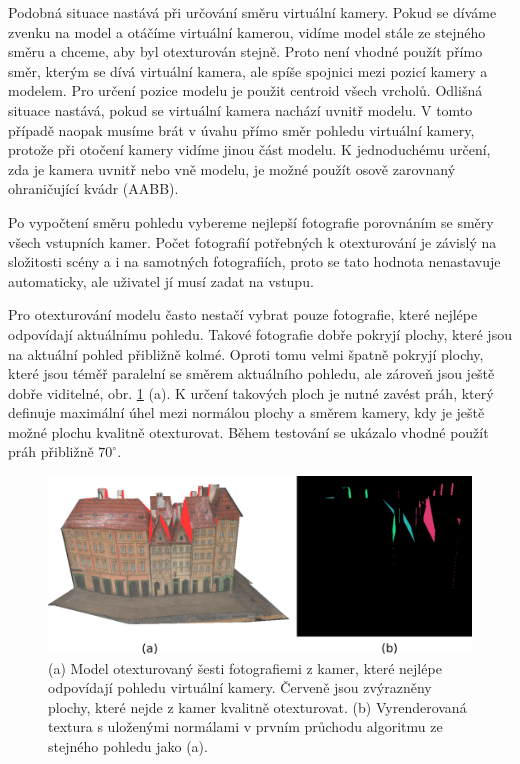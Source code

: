 \documentclass[11pt,twoside,a4paper]{book}
\begin{document}
Podobná situace nastává při určování směru virtuální kamery.  Pokud se díváme zvenku na model a otáčíme virtuální kamerou, vidíme model stále ze stejného směru a chceme, aby byl otexturován stejně. Proto není vhodné použít přímo směr, kterým se dívá virtuální kamera, ale spíše spojnici mezi pozicí kamery a modelem. Pro určení pozice modelu je použit centroid všech vrcholů. Odlišná situace nastává, pokud se virtuální kamera nachází uvnitř modelu. V tomto případě naopak musíme brát v úvahu přímo směr pohledu virtuální kamery, protože při otočení kamery vidíme jinou část modelu. K jednoduchému určení, zda je kamera uvnitř nebo vně modelu, je možné použít osově zarovnaný ohraničující kvádr (AABB).


Po vypočtení směru pohledu vybereme nejlepší fotografie porovnáním se směry všech vstupních kamer. Počet fotografií potřebných k otexturování je závislý na složitosti scény a i na samotných fotografiích, proto se tato hodnota nenastavuje automaticky, ale uživatel jí musí zadat na vstupu.

Pro otexturování modelu často nestačí vybrat pouze fotografie, které nejlépe odpovídají aktuálnímu pohledu. Takové fotografie dobře pokryjí plochy, které jsou na aktuální pohled přibližně kolmé. Oproti tomu velmi špatně pokryjí plochy, které jsou téměř paralelní se směrem aktuálního pohledu, ale zároveň jsou ještě dobře viditelné, obr. \ref{fig:faces-no-tex} (a). K určení takových ploch je nutné zavést práh, který definuje maximální úhel mezi normálou plochy a směrem kamery, kdy je ještě možné plochu kvalitně otexturovat. Během testování se ukázalo vhodné použít práh přibližně $70^{\circ}$. 


\begin{figure}[h]
\begin{center}
\includegraphics[width=\textwidth]{figures/faces-no-tex}
\caption{(a) Model otexturovaný šesti fotografiemi z kamer, které nejlépe odpovídají pohledu virtuální kamery. Červeně jsou zvýrazněny plochy, které nejde z kamer kvalitně otexturovat. (b) Vyrenderovaná textura s uloženými normálami v prvním průchodu algoritmu ze stejného pohledu jako (a).}
\label{fig:faces-no-tex}
\end{center}
\end{figure}
\end{document}
